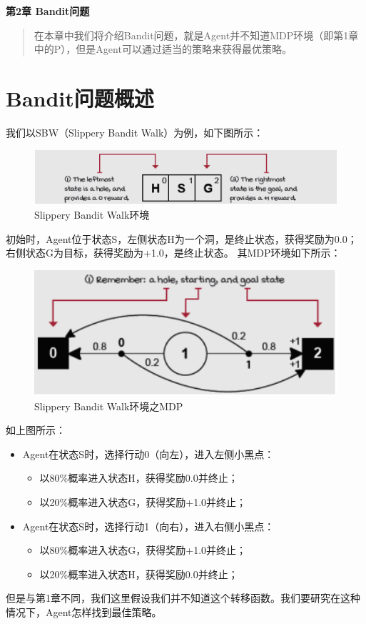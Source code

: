 \newpage
\maketitle
\begin{center}
\Large \textbf{第2章 Bandit问题} \quad 
\end{center}
\begin{abstract}
在本章中我们将介绍Bandit问题，就是Agent并不知道MDP环境（即第1章中的P），但是Agent可以通过适当的策略来获得最优策略。
\end{abstract}
\section{Bandit问题概述}
我们以SBW（Slippery Bandit Walk）为例，如下图所示：
\begin{figure}[H]
	\caption{Slippery Bandit Walk环境}
	\label{p000012}
	\centering
	\includegraphics[width=15cm]{images/p000012}
\end{figure}
初始时，Agent位于状态S，左侧状态H为一个洞，是终止状态，获得奖励为0.0；右侧状态G为目标，获得奖励为+1.0，是终止状态。
其MDP环境如下所示：
\begin{figure}[H]
	\caption{Slippery Bandit Walk环境之MDP}
	\label{p000013}
	\centering
	\includegraphics[width=15cm]{images/p000013}
\end{figure}
如上图所示：
\begin{itemize}
    \item Agent在状态S时，选择行动0（向左），进入左侧小黑点：
    \begin{itemize}
        \item 以80\%概率进入状态H，获得奖励0.0并终止；
        \item 以20\%概率进入状态G，获得奖励+1.0并终止；
    \end{itemize}
    \item Agent在状态S时，选择行动1（向右），进入右侧小黑点：
    \begin{itemize}
        \item 以80\%概率进入状态G，获得奖励+1.0并终止；
        \item 以20\%概率进入状态H，获得奖励0.0并终止；
    \end{itemize}
\end{itemize}
但是与第1章不同，我们这里假设我们并不知道这个转移函数。我们要研究在这种情况下，Agent怎样找到最佳策略。
